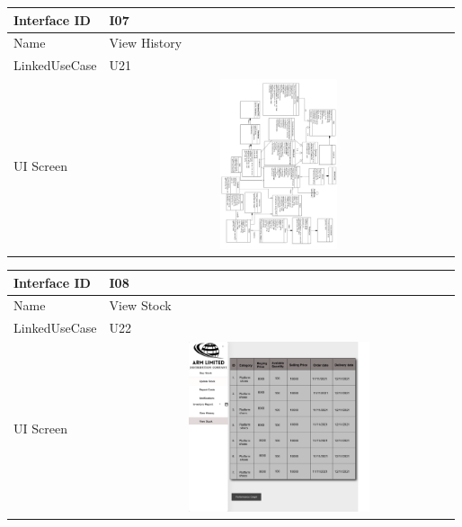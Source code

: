 \documentclass[12pt]{article}
\begin{document}
\begin{table}[H] 
\begin{tabular} {|m{6em}|m{12cm}|}
\hline
Interface ID & I07 \\ \hline
\newline
Name & View History\\ \hline
LinkedUseCase &  U21 \\ \hline
UI Screen &\newline \includegraphics [width=10cm, height=5cm] {8.png} \\ \hline

\end{tabular}
\end{table}
\begin{table}[H] 
\begin{tabular} {|m{6em}|m{12cm}|}
\hline
Interface ID & I08 \\ \hline
\newline
Name & View Stock\\ \hline
LinkedUseCase & U22  \\ \hline
UI Screen &\newline \includegraphics [width=10cm, height=5cm] {9.png} \\ \hline

\end{tabular}
\end{table}
\end{document}
